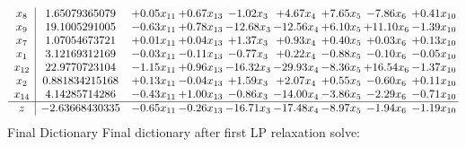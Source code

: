 \documentclass[8pt]{article}
\begin{document}
 \[\begin{array}{c| c c@{\hskip 2pt} c@{\hskip 2pt} c@{\hskip 2pt} c@{\hskip 2pt} c@{\hskip 2pt} c@{\hskip 2pt} c@{\hskip 2pt} }
 x_{8}   &  1.65079365079 & +  0.05 x_{11} & +  0.67 x_{13} & -1.02 x_{3} & +  4.67 x_{4} & +  7.65 x_{5} & -7.86 x_{6} & +  0.41 x_{10}\\
 x_{9}   &  19.1005291005 & -0.63 x_{11} & +  0.78 x_{13} & -12.68 x_{3} & -12.56 x_{4} & +  6.10 x_{5} & + 11.10 x_{6} & -1.39 x_{10}\\
 x_{7}   &  1.07054673721 & +  0.01 x_{11} & +  0.04 x_{13} & +  1.37 x_{3} & +  0.93 x_{4} & +  0.40 x_{5} & +  0.03 x_{6} & +  0.13 x_{10}\\
 x_{1}   &  3.12169312169 & -0.03 x_{11} & -0.11 x_{13} & -0.77 x_{3} & +  0.22 x_{4} & -0.88 x_{5} & -0.10 x_{6} & -0.05 x_{10}\\
 x_{12}   &  22.9770723104 & -1.15 x_{11} & +  0.96 x_{13} & -16.32 x_{3} & -29.93 x_{4} & -8.36 x_{5} & + 16.54 x_{6} & -1.37 x_{10}\\
 x_{2}   &  0.881834215168 & +  0.13 x_{11} & -0.04 x_{13} & +  1.59 x_{3} & +  2.07 x_{4} & +  0.55 x_{5} & -0.60 x_{6} & +  0.11 x_{10}\\
 x_{14}   &  4.14285714286 & -0.43 x_{11} & +  1.00 x_{13} & -0.86 x_{3} & -14.00 x_{4} & -3.86 x_{5} & -2.29 x_{6} & -0.71 x_{10}\\
\hline
z    &  -2.63668430335 & -0.65 x_{11} & -0.26 x_{13} & -16.71 x_{3} & -17.48 x_{4} & -8.97 x_{5} & -1.94 x_{6} & -1.19 x_{10}\\
\end{array}\]
Final Dictionary
Final dictionary after first LP relaxation solve: 
\end{document}
